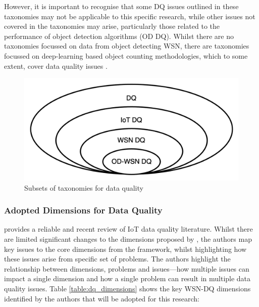 However, it is important to recognise that some DQ issues outlined in these taxonomies may not be applicable to this specific research, while other issues not covered in the taxonomies may arise, particularly those related to the performance of object detection algorithms (OD DQ). Whilst there are no taxonomies focussed on data from object detecting WSN, there are taxonomies focussed on deep-learning based object counting methodologies, which to some extent, cover data quality issues \citep{heinrichEverythingCountsTaxonomy2019}.

\begin{figure}[h]
    \centering
    \includegraphics[scale=0.15]{figures/literature_review/taxonomy_subsets.png}
    \caption{Subsets of taxonomies for data quality}
    \label{fig:taxonomy_subsets}
\end{figure}

\subsubsection{Adopted Dimensions for Data Quality}
\cite{mansouriIoTDataQuality2023} provides a reliable and recent review of IoT data quality literature. Whilst there are limited significant changes to the dimensions proposed by \cite{karkouchDataQualityInternet2016}, the authors map key issues to the core dimensions from the \cite{karkouchDataQualityInternet2016} framework, whilst highlighting how these issues arise from specific set of problems. The authors highlight the relationship between dimensions, problems and issues---how multiple issues can impact a single dimension and how a single problem can result in multiple data quality issues. Table \ref{table:dq_dimensions} shows the key WSN-DQ dimensions identified by the authors that will be adopted for this research:



